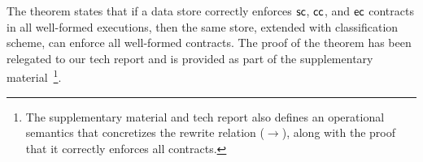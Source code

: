 The theorem states that if a data store correctly enforces ${\sf sc}$, ${\sf cc}$,
and ${\sf ec}$ contracts in all well-formed executions, then the same store,
extended with classification scheme, can enforce all well-formed \name
contracts. The proof of the theorem has been relegated to our tech report
and is provided as part of the supplementary
material~\cite{techrep}\footnote{The supplementary material and tech report
  also defines an operational semantics that concretizes the rewrite
  relation ($\xrightarrow{}$), along with the proof that it correctly
  enforces all \name contracts.}.


